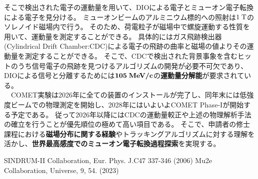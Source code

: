 \documentclass[11pt,a4j,dvipdfmx]{jarticle} 					%
\newcommand{\研究課題名}{COMET Phase-Iに向けたエンジニアリングランおよびその物理解析}
\newcommand{\研究機関名}{大阪大学}
\newcommand{\研究代表者氏名}{高見 翔太   }
\begin{document}
そこで検出された電子の運動量を用いて、DIOによる電子とミューオン電子転換による電子を見分ける。
ミューオンビームのアルミニウム標的への照射は$1\;\rm{T}$のソレノイド磁場内で行う。
そのため、荷電粒子が磁場中で螺旋運動する性質を用いて、運動量を測定することができる。
具体的にはガス飛跡検出器(Cylindrical Drift Chamber:CDC)による電子の飛跡の曲率と磁場の値よりその運動量を測定することができる。
そこで、CDCで検出された背景事象を含むヒットのうち信号電子の飛跡を見つけるアルゴリズムの開発が必要不可欠であり、DIOによる信号と分離するためには$\mathbf{105\;\rm{\textbf{MeV/c}}}$の\textbf{運動量分解能}が要求されている。\\
　COMET実験は2026年に全ての装置のインストールが完了し、同年末には低強度ビームでの物理測定を開始し、2028年にはいよいよCOMET Phase-Iが開始する予定である。
従って2026年以降にはCDCの運動量較正や上述の物理解析手法の確立を行うことが優先順位の極めて高い項目である。
そこで、申請者の修士課程における\textbf{磁場分布に関する経験}やトラッキングアルゴリズムに対する理解を活かし、\textbf{世界最高感度でのミューオン電子転換過程探索}を実現する。

\small
\vspace{-0.3cm}
\begin{thebibliography}{99}
	 SINDRUM-II Collaboration, Eur. Phys. J.C47 337-346 (2006)
	\vspace{-0.1cm}
	Mu2e Collaboration, Universe, 9, 54. (2023) 
\end{thebibliography}













\end{document}
